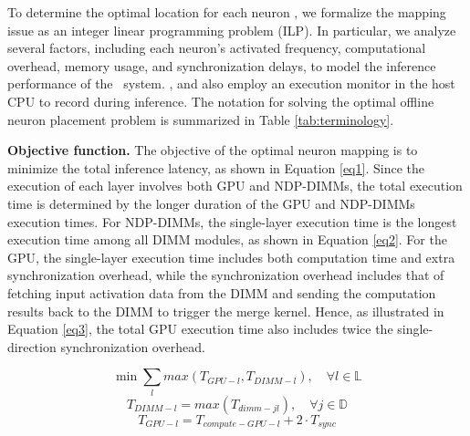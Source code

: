 


To determine the optimal location for each neuron , we formalize the mapping issue as an integer linear programming problem (ILP). In particular, we analyze several factors, including each neuron's activated frequency, computational overhead, memory usage, and synchronization delays, to model the inference performance of the \name~system. , and also employ an execution monitor in the host CPU to record during inference. The notation for solving the optimal offline neuron placement problem is summarized in Table \ref{tab:terminology}.

\textbf{Objective function.}
The objective of the optimal neuron mapping is to minimize the total inference latency, as shown in Equation \ref{eq1}. Since the execution of each layer involves both GPU and NDP-DIMMs, the total execution time is determined by the longer duration of the GPU and NDP-DIMMs execution times. For NDP-DIMMs, the single-layer execution time is the longest execution time among all DIMM modules, as shown in Equation \ref{eq2}. For the GPU, the single-layer execution time includes both computation time and extra synchronization overhead, while the synchronization overhead includes that of fetching input activation data from the DIMM and sending the computation results back to the DIMM to trigger the merge kernel. Hence, as illustrated in Equation \ref{eq3}, the total GPU execution time also includes twice the single-direction synchronization overhead. 

{
\setlength\abovedisplayskip{0pt}
\setlength\belowdisplayskip{0pt}
\begin{equation}
    \min \textstyle \sum_{l} max (T_{GPU-l}, T_{DIMM-l}), \quad \forall l \in \mathbb{L} \label{eq1}
\end{equation}
\begin{equation}
     T_{DIMM-l} = max (T_{dimm-jl}), \quad \forall j \in \mathbb{D} \label{eq2}
\end{equation}
\begin{equation}
    T_{GPU-l} = T_{compute-GPU-l} + 2\cdot T_{sync} \label{eq3}
\end{equation}
}


